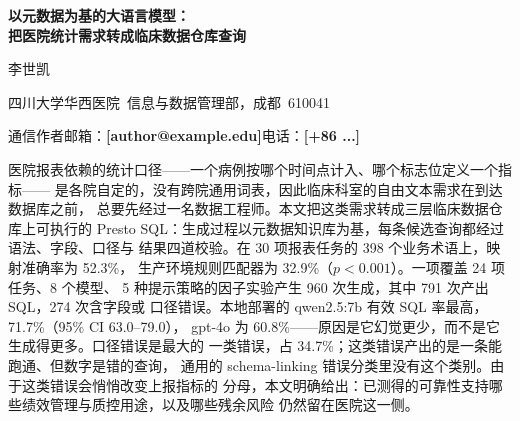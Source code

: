 \documentclass[11pt,a4paper]{article}
\newcommand{\PH}[1]{{\color{red}\textbf{[#1]}}}
\begin{document}
\begin{center}
{\sffamily\bfseries\LARGE 以元数据为基的大语言模型：\\[2pt]
把医院统计需求转成临床数据仓库查询\par}

\vspace{10pt}
{\normalsize 李世凯\par}
\vspace{4pt}
{\small 四川大学华西医院\ 信息与数据管理部，成都\ 610041\par}
\vspace{2pt}
{\small 通信作者邮箱：\PH{author@example.edu}\qquad 电话：\PH{+86 ...}\par}
\end{center}

\vspace{6pt}
\noindent{}

\vspace{10pt}
\quad
医院报表依赖的统计口径——一个病例按哪个时间点计入、哪个标志位定义一个指标——
是各院自定的，没有跨院通用词表，因此临床科室的自由文本需求在到达数据库之前，
总要先经过一名数据工程师。本文把这类需求转成三层临床数据仓库上可执行的
Presto SQL：生成过程以元数据知识库为基，每条候选查询都经过语法、字段、口径与
结果四道校验。在 30 项报表任务的 398 个业务术语上，映射准确率为 52.3\%，
生产环境规则匹配器为 32.9\%（$p<0.001$）。一项覆盖 24 项任务、8 个模型、
5 种提示策略的因子实验产生 960 次生成，其中 791 次产出 SQL，274 次含字段或
口径错误。本地部署的 qwen2.5:7b 有效 SQL 率最高，71.7\%（95\% CI 63.0--79.0），
gpt-4o 为 60.8\%——原因是它幻觉更少，而不是它生成得更多。口径错误是最大的
一类错误，占 34.7\%；这类错误产出的是一条能跑通、但数字是错的查询，
通用的 schema-linking 错误分类里没有这个类别。由于这类错误会悄悄改变上报指标的
分母，本文明确给出：已测得的可靠性支持哪些绩效管理与质控用途，以及哪些残余风险
仍然留在医院这一侧。
\end{document}
